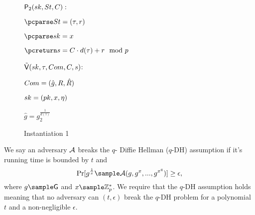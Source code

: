 \begin{figure}[htb!]
{\begin{minipage}[t]{0.5\textwidth}
              \underline{$\mathsf{P}_2(sk,St,C):$}
            \begin{nicodemus}
            	\item $\pcparse \st = (\tau,r)$
		\item $\pcparse \sk = x$
                \item $\pcreturn \s =\c\cdot d(\tau) + r \mod p$
            \end{nicodemus}
                        \underline{$\tilde{\mathsf{V}}(sk,\tau,Com, C,s)$}:
            \begin{nicodemus}
                \item \pcparse $Com = (\hat{g},R,\hat{R})$
                \item \pcparse $sk = (pk,x,\eta)$
                \item \pcif $\hat{g} = g_2^{\frac{1}{d(\tau)}}$ 
                \item \quad \pcthen {}
                \item \pcelse {}
            \end{nicodemus}
        \end{minipage}
    }
    \caption{Instantiation 1}
    \label{fig:prf-security}
\end{figure}

\begin{definition}[$q$-DH Assumption]
We say an adversary $\mathcal{A}$ breaks the $q$- Diffie Hellman ($q$-DH) assumption if it's running time is bounded by $t$ and
$$\Pr[g^{\frac{1}{x}} \sample \adv(g,g^x,...,g^{x^q})] \geq \epsilon,$$
where 
$g \sample \G$ and $x \sample \mathbb{Z}_p^*$.
We require that the $q$-DH assumption holds meaning that no adversary can $(t, \epsilon)$ break the $q$-DH problem for a polynomial $t$ and a non-negligible $\epsilon$.
\end{definition}


